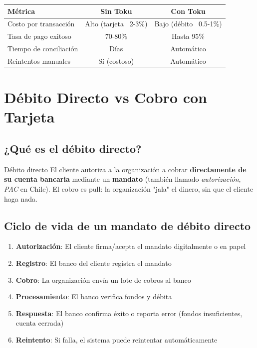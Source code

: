 \documentclass[11pt,a4paper]{article}
\begin{document}
\begin{center}
\begin{tabular}{lcc}
\toprule
\textbf{Métrica} & \textbf{Sin Toku} & \textbf{Con Toku} \\
\midrule
Costo por transacción & Alto (tarjeta ~2-3\%) & Bajo (débito ~0.5-1\%) \\
Tasa de pago exitoso & 70-80\% & Hasta 95\% \\
Tiempo de conciliación & Días & Automático \\
Reintentos manuales & Sí (costoso) & Automático \\
\bottomrule
\end{tabular}
\end{center}

\section{Débito Directo vs Cobro con Tarjeta}

\subsection{¿Qué es el débito directo?}

\begin{dominiobox}{Débito directo}
El cliente autoriza a la organización a cobrar \textbf{directamente de su cuenta bancaria}
mediante un \textbf{mandato} (también llamado \textit{autorización}, \textit{PAC} en Chile).
El cobro es pull: la organización "jala" el dinero, sin que el cliente haga nada.
\end{dominiobox}

\subsection{Ciclo de vida de un mandato de débito directo}

\begin{enumerate}
  \item \textbf{Autorización}: El cliente firma/acepta el mandato digitalmente o en papel
  \item \textbf{Registro}: El banco del cliente registra el mandato
  \item \textbf{Cobro}: La organización envía un lote de cobros al banco
  \item \textbf{Procesamiento}: El banco verifica fondos y débita
  \item \textbf{Respuesta}: El banco confirma éxito o reporta error (fondos insuficientes, cuenta cerrada)
  \item \textbf{Reintento}: Si falla, el sistema puede reintentar automáticamente
\end{enumerate}
\end{document}
